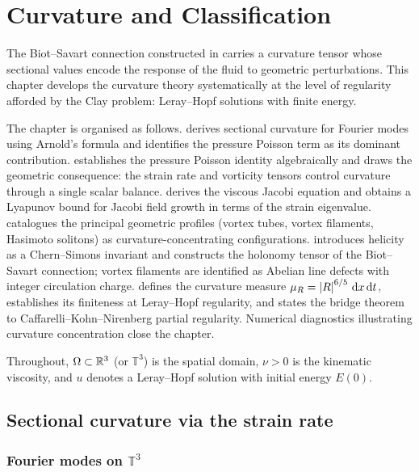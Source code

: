 \chapter{Curvature and Classification}\label{ch:curvature}

The Biot--Savart connection constructed in  carries a curvature tensor
whose sectional values encode the response of the fluid to geometric perturbations.
This chapter develops the curvature theory systematically at the level of regularity
afforded by the Clay problem: Leray--Hopf solutions with finite energy.

The chapter is organised as follows.
 derives sectional curvature for Fourier modes using Arnold's formula
and identifies the pressure Poisson term as its dominant contribution.
 establishes the pressure Poisson identity algebraically and
draws the geometric consequence: the strain rate and vorticity tensors control curvature
through a single scalar balance.
 derives the viscous Jacobi equation and obtains a Lyapunov bound
for Jacobi field growth in terms of the strain eigenvalue.
 catalogues the principal geometric profiles
(vortex tubes, vortex filaments, Hasimoto solitons) as curvature-concentrating configurations.
 introduces helicity as a Chern--Simons invariant and constructs the
holonomy tensor of the Biot--Savart connection; vortex filaments are identified as Abelian
line defects with integer circulation charge.
 defines the curvature measure
$\mu_R = \left\lvert R \right\rvert^{6/5}\,\mathrm{d} x\,\mathrm{d} t$, establishes its finiteness at Leray--Hopf regularity,
and states the bridge theorem to Caffarelli--Kohn--Nirenberg partial regularity.
Numerical diagnostics illustrating curvature concentration close the chapter.

Throughout, $\Omega \subset \mathbb{R}^3$ (or $\mathbb{T}^3$) is the spatial domain, $\nu > 0$ is
the kinematic viscosity, and $u$ denotes a Leray--Hopf solution with initial energy $E(0)$.

\section{Sectional curvature via the strain rate}\label{sec:curv-arnold}

\subsection{Fourier modes on \texorpdfstring{$\mathbb{T}^3$}{T3}}

